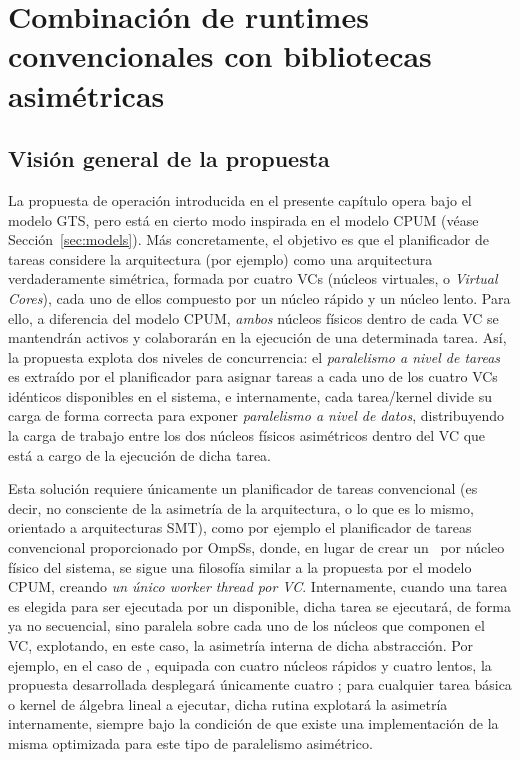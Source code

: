 \section{Combinación de runtimes convencionales con bibliotecas asimétricas}

\subsection{Visión general de la propuesta}

La propuesta de operación introducida en el presente capítulo opera bajo el modelo GTS, pero está en cierto modo 
inspirada en el modelo CPUM (véase Sección~\ref{sec:models}). Más concretamente, el objetivo es que el planificador
de tareas considere la arquitectura \odroid (por ejemplo) como una arquitectura verdaderamente simétrica, formada por 
cuatro VCs (núcleos virtuales, o {\em Virtual Cores}), cada uno de ellos compuesto por un núcleo rápido y un núcleo
lento. Para ello, a diferencia del modelo CPUM, {\em ambos} núcleos físicos dentro de cada VC se mantendrán activos y 
colaborarán en la ejecución de una determinada tarea. Así, la propuesta explota dos niveles de concurrencia: el {\em paralelismo
a nivel de tareas} es extraído por el planificador para asignar tareas a cada uno de los cuatro VCs idénticos disponibles en
el sistema, e internamente, cada tarea/kernel divide su carga de forma correcta para exponer {\em paralelismo a nivel de datos}, 
distribuyendo la carga de trabajo entre los dos núcleos físicos asimétricos dentro del VC que está a cargo de la ejecución
de dicha tarea.

Esta solución requiere únicamente un planificador de tareas convencional (es decir, no consciente de la asimetría de la arquitectura, o lo
que es lo mismo, orientado a arquitecturas SMT), como por ejemplo el planificador de tareas convencional proporcionado por OmpSs, donde, 
en lugar de crear un \wt\ por núcleo físico del sistema, se sigue una filosofía similar a la propuesta por el modelo CPUM, creando 
{\em un único worker thread por VC}. Internamente, cuando una tarea es elegida para ser ejecutada por un \wt disponible, dicha tarea
se ejecutará, de forma ya no secuencial, sino paralela sobre cada uno de los núcleos que componen el VC, explotando, en este caso,
la asimetría interna de dicha abstracción. Por ejemplo, en el caso de \odroid, equipada con cuatro núcleos rápidos y cuatro lentos, 
la propuesta desarrollada desplegará únicamente cuatro \wts; para cualquier tarea básica o kernel de álgebra lineal a ejecutar, dicha
rutina explotará la asimetría internamente, siempre bajo la condición de que existe una implementación de la misma optimizada para
este tipo de paralelismo asimétrico.

